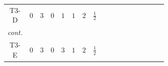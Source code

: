 \documentclass[8pt]{article}
\begin{document}
\begin{landscape}
\begin{longtable}{@{}cccccccc >{\raggedright\arraybackslash}p{0.21\linewidth} >{\raggedright\arraybackslash}p{0.21\linewidth} >{\raggedright\arraybackslash}p{0.21\linewidth}@{}}
T3-D & $0$ & $3$ & $0$ & $1$ & $1$ & $2$ & $\frac{1}{2}$ & \scriptsize\adjustbox{max width=\linewidth}{$\begin{gathered} +\frac{3 \hbar  H_{a_1} H_{a_2} H_{a_1}{}^{\dagger } H_{a_2}{}^{\dagger } \left(\lambda_{H1}^{(2)}\right){}^2}{2 \epsilon } \\ +\frac{\hbar  H_{a_3} H_{a_4} H_{a_1}{}^{\dagger } H_{a_2}{}^{\dagger } \mathcal{I}_{H2,a_1,a_3}{}^1 \mathcal{I}_{H2,a_2,a_4}{}^1 \left(\lambda_{H2}^{(1)}\right){}^2}{2 \epsilon } \\ +C_{\text{H2}} H_{a_1} H_{a_1}{}^{\dagger }\end{gathered}$} & \scriptsize\adjustbox{max width=\linewidth}{$\begin{gathered} -\frac{7 \hbar  B_{\mu _1\mu _2}^2}{12 \epsilon }\end{gathered}$} & \scriptsize\adjustbox{max width=\linewidth}{$\begin{gathered} -\frac{2 \hbar  \left(W_{\mu _1\mu _2}^{A_1}\right){}^2}{3 \epsilon }\end{gathered}$} \\
\textit{cont.} &  &  &  &  &  &  &  & \scriptsize\adjustbox{max width=\linewidth}{$\begin{gathered} -H_{a_1} \mu ^2 H_{a_1}{}^{\dagger } \\ +\frac{2 \hbar  \overline{\lambda_{T3}} H_{a_1} H_{a_2} \lambda_{T3} H_{a_1}{}^{\dagger } H_{a_2}{}^{\dagger }}{\sqrt{3} \epsilon } \\ +\text{CH21} \hbar  H_{a_2} H_{a_1}{}^{\dagger } \mathcal{I}_{H2,a_1,a_2}{}^1\end{gathered}$} &  &  \\
\midrule
T3-E & $0$ & $3$ & $0$ & $3$ & $1$ & $2$ & $\frac{1}{2}$ & \scriptsize\adjustbox{max width=\linewidth}{$\begin{gathered} +\frac{3 \hbar  H_{a_1} H_{a_2} H_{a_1}{}^{\dagger } H_{a_2}{}^{\dagger } \left(\lambda_{H1}^{(2)}\right){}^2}{2 \epsilon } \\ +\frac{3 \hbar  H_{a_1} H_{a_2} H_{a_1}{}^{\dagger } H_{a_2}{}^{\dagger } \left(\lambda_{H2}^{(2)}\right){}^2}{2 \epsilon } \\ +C_{\text{H2}} H_{a_1} H_{a_1}{}^{\dagger }\end{gathered}$} & \scriptsize\adjustbox{max width=\linewidth}{$\begin{gathered} -\frac{3 \hbar  B_{\mu _1\mu _2}^2}{4 \epsilon }\end{gathered}$} & \scriptsize\adjustbox{max width=\linewidth}{$\begin{gathered} -\frac{5 \hbar  \left(W_{\mu _1\mu _2}^{A_1}\right){}^2}{6 \epsilon }\end{gathered}$} \\

\end{longtable}
\end{landscape}
\end{document}
